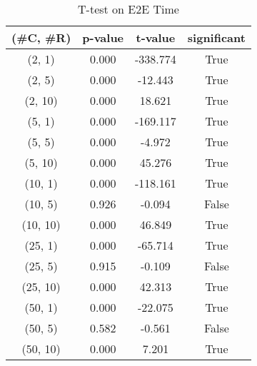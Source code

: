 \begin{table}[h]
\centering
\caption{T-test on E2E Time}
\label{tab:t-testExperiment}
\begin{tabular}{|c|c|c|c|}
\toprule
(\#C, \#R) &  p-value &  t-value &  significant \\
\midrule
  (2, 1) &    0.000 & -338.774 &         True \\
  (2, 5) &    0.000 &  -12.443 &         True \\
 (2, 10) &    0.000 &   18.621 &         True \\
  (5, 1) &    0.000 & -169.117 &         True \\
  (5, 5) &    0.000 &   -4.972 &         True \\
 (5, 10) &    0.000 &   45.276 &         True \\
 (10, 1) &    0.000 & -118.161 &         True \\
 (10, 5) &    0.926 &   -0.094 &        False \\
(10, 10) &    0.000 &   46.849 &         True \\
 (25, 1) &    0.000 &  -65.714 &         True \\
 (25, 5) &    0.915 &   -0.109 &        False \\
(25, 10) &    0.000 &   42.313 &         True \\
 (50, 1) &    0.000 &  -22.075 &         True \\
 (50, 5) &    0.582 &   -0.561 &        False \\
(50, 10) &    0.000 &    7.201 &         True \\
\bottomrule
\end{tabular}
\end{table}
